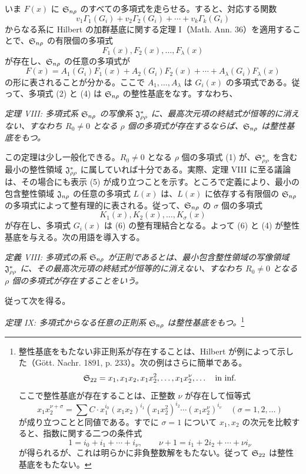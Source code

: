 \documentclass[11pt]{article}
\begin{document}
いま $F(x)$ に $\mathfrak{S}_{n\rho}$ のすべての多項式を走らせる。すると、対応する関数
\[
  v_1\Gamma_1(G_i)+v_2\Gamma_2(G_i)+\cdots+v_k\Gamma_k(G_i)
\]
からなる系に Hilbert の加群基底に関する定理 I（Math. Ann. 36）を適用することで、$\mathfrak{S}_{n\rho}$ の有限個の多項式
\begin{equation}
  F_1(x),F_2(x),\ldots,F_\lambda(x)
\tag{4}
\end{equation}
が存在し、$\mathfrak{S}_{n\rho}$ の任意の多項式が
\begin{equation}
  F(x)=A_1(G_i)F_1(x)+A_2(G_i)F_2(x)+\cdots+A_\lambda(G_i)F_\lambda(x)
\tag{5}
\end{equation}
の形に表されることが分かる。ここで $A_1,\ldots,A_\lambda$ は $G_i(x)$ の多項式である。従って、多項式 (2) と (4) は $\mathfrak{S}_{n\rho}$ の整性基底をなす。すなわち、

\emph{定理 VIII: 多項式系 $\mathfrak{S}_{n\rho}$ の写像系 $\mathfrak{J}^*_{\rho\rho}$ に、最高次元項の終結式が恒等的に消えない、すなわち $R_0\ne0$ となる $\rho$ 個の多項式が存在するならば、$\mathfrak{S}_{n\rho}$ は整性基底をもつ。}

この定理は少し一般化できる。$R_0\ne0$ となる $\rho$ 個の多項式 (1) が、$\mathfrak{S}^*_{\rho\rho}$ を含む最小の整性領域 $\mathfrak{J}^*_{\rho\rho}$ に属していれば十分である。実際、定理 VIII に至る議論は、その場合にも表示 (5) が成り立つことを示す。ところで定義により、最小の包含整性領域 $\mathfrak{J}_{n\rho}$ の任意の多項式 $L(x)$ は、$L(x)$ に依存する有限個の $\mathfrak{S}_{n\rho}$ の多項式によって整有理的に表される。従って、$\mathfrak{S}_{n\rho}$ の $\sigma$ 個の多項式
\begin{equation}
  K_1(x),K_2(x),\ldots,K_\sigma(x)
\tag{6}
\end{equation}
が存在し、多項式 $G_i(x)$ は (6) の整有理結合となる。よって (6) と (4) が整性基底を与える。次の用語を導入する。

\emph{定義 VIII: 多項式の系 $\mathfrak{S}_{n\rho}$ が正則であるとは、最小包含整性領域の写像領域 $\mathfrak{J}^*_{\rho\rho}$ に、その最高次元項の終結式が恒等的に消えない、すなわち $R_0\ne0$ となる $\rho$ 個の多項式が存在することをいう。}

従って次を得る。

\emph{定理 IX: 多項式からなる任意の正則系 $\mathfrak{S}_{n\rho}$ は整性基底をもつ。}\footnote{整性基底をもたない非正則系が存在することは、Hilbert が例によって示した（Gött. Nachr. 1891, p. 233）。次の例はさらに簡単である。
\[
  \mathfrak{S}_{22}=x_1,
  x_1x_2,
  x_1x_2^2,
  \ldots,
  x_1x_2^\nu,
  \ldots\quad\text{in inf.}
\]
ここで整性基底が存在することは、正整数 $\nu$ が存在して恒等式
\[
  x_1x_2^{\nu+\sigma}=\sum C\cdot x_1^{i_0}(x_1x_2)^{i_1}(x_1x_2^2)^{i_2}\cdots(x_1x_2^\nu)^{i_\nu}
  \quad(\sigma=1,2,\ldots)
\]
が成り立つことと同値である。すでに $\sigma=1$ について $x_1,x_2$ の次元を比較すると、指数に関する二つの条件式
\[
  1=i_0+i_1+\cdots+i_\nu,
  \qquad
  \nu+1=i_1+2i_2+\cdots+\nu i_\nu
\]
が得られるが、これは明らかに非負整数解をもたない。従って $\mathfrak{S}_{22}$ は整性基底をもたない。}
\end{document}
